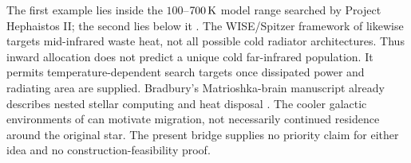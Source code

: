 The first example lies inside the $100$--$700\,{\rm K}$ model range
searched by Project Hephaistos II; the second lies below it
\citep{Suazo2024}. The WISE/Spitzer framework of \citet{Wright2014b}
likewise targets mid-infrared waste heat, not all possible cold radiator
architectures. Thus inward allocation does not predict a unique cold
far-infrared population. It permits temperature-dependent search targets
once dissipated power and radiating area are supplied. Bradbury's
Matrioshka-brain manuscript already describes nested stellar computing
and heat disposal \citep{Bradbury1999}. The cooler galactic environments
of \citet{CirkovicBradbury2006} can motivate migration, not necessarily
continued residence around the original star. The present bridge supplies
no priority claim for either idea and no construction-feasibility proof.
